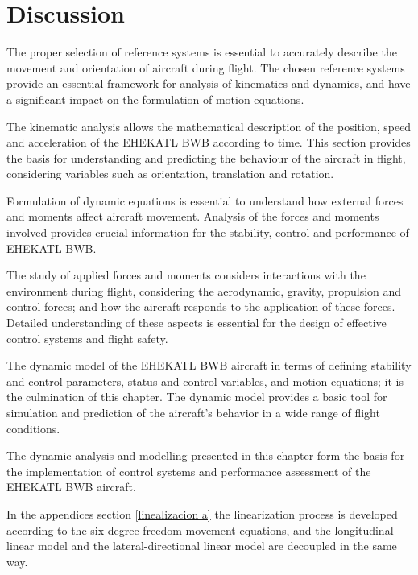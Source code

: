 \section{Discussion}

The proper selection of reference systems is essential to accurately describe the movement and orientation of aircraft during flight. The chosen reference systems provide an essential framework for analysis of kinematics and dynamics, and have a significant impact on the formulation of motion equations.

The kinematic analysis allows the mathematical description of the position, speed and acceleration of the EHEKATL BWB according to time. This section provides the basis for understanding and predicting the behaviour of the aircraft in flight, considering variables such as orientation, translation and rotation.

Formulation of dynamic equations is essential to understand how external forces and moments affect aircraft movement. Analysis of the forces and moments involved provides crucial information for the stability, control and performance of EHEKATL BWB.

The study of applied forces and moments considers interactions with the environment during flight, considering the aerodynamic, gravity, propulsion and control forces; and how the aircraft responds to the application of these forces. Detailed understanding of these aspects is essential for the design of effective control systems and flight safety.

The dynamic model of the EHEKATL BWB aircraft in terms of defining stability and control parameters, status and control variables, and motion equations; it is the culmination of this chapter. The dynamic model provides a basic tool for simulation and prediction of the aircraft's behavior in a wide range of flight conditions.

The dynamic analysis and modelling presented in this chapter form the basis for the implementation of control systems and performance assessment of the EHEKATL BWB aircraft.

In the appendices section \ref{linealizacion a} the linearization process is developed according to the six degree freedom movement equations, and the longitudinal linear model and the lateral-directional linear model are decoupled in the same way.





